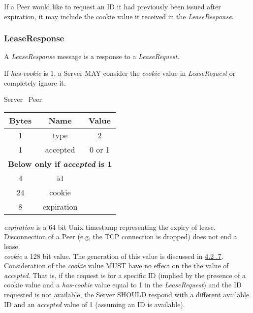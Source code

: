 \documentclass{article}
\begin{document}
    If a Peer would like to request an ID it had previously been issued after expiration, it may include the cookie
    value it received in the \emph{LeaseResponse}.

    \subsubsection{LeaseResponse}

    A \emph{LeaseResponse} message is a response to a \emph{LeaseRequest}.

    If \emph{has-cookie} is 1, a Server MAY consider the \emph{cookie} value in \emph{LeaseRequest} or completely
    ignore it.

    \begin{center}
        Server \textrightarrow\ Peer\\
        \begin{tabular}{|c|c|c|}
            \hline
            \textbf{Bytes} & \textbf{Name} & \textbf{Value} \\
            \hline
            1              & type          & 2              \\
            \hline
            1              & accepted      & 0 or 1         \\
            \hline
            \multicolumn{3}{|c|}{\textbf{Below only if \emph{accepted} is 1} } \\
            \hline
            4              & id            &                \\
            \hline
            24             & cookie        &                \\
            \hline
            8              & expiration    &                \\
            \hline
        \end{tabular}
    \end{center}

    \emph{expiration} is a 64 bit Unix timestamp representing the expiry of lease. Disconnection of a Peer (e.g,
    the TCP connection is dropped) does not end a lease.\\

    \emph{cookie} a 128 bit value. The generation of this value is discussed in \hyperlink{subsubsection.4.2.7}{4.2
    .7}.\\

    Consideration of the \emph{cookie} value MUST have no effect on the the value of \emph{accepted}. That is, if the
    request is for a specific ID (implied by the presence of a cookie value and a \emph{has-cookie} value equal to 1
    in the \emph{LeaseRequest}) and the ID requested is not available, the Server SHOULD respond with a different
    available ID and an \emph{accepted} value of 1 (assuming an ID is available).\\
\end{document}
